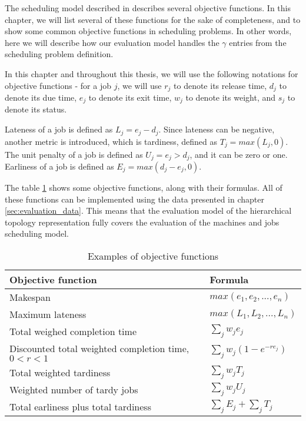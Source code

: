 The scheduling model described in \citep{pinedo2016scheduling} describes several objective functions. In this chapter, we will list several of these functions for the sake of completeness, and to show some common objective functions in scheduling problems. In other words, here we will describe how our evaluation model handles the $ \gamma $ entries from the scheduling problem definition.

In this chapter and throughout this thesis, we will use the following notations for objective functions - for a job $j$, we will use $r_j$ to denote its release time, $d_j$ to denote its due time, $e_j$ to denote its exit time, $w_j$ to denote its weight, and $s_j$ to denote its status.

Lateness of a job is defined as $L_j = e_j - d_j$. Since lateness can be negative, another metric is introduced, which is tardiness, defined as $T_j = max(L_j, 0)$. The unit penalty of a job is defined as $U_j = e_j > d_j$, and it can be zero or one. Earliness of a job is defined as $E_j = max(d_j - e_j, 0)$.

The table \ref{tab:objective_functions_table} shows some objective functions, along with their formulas. All of these functions can be implemented using the data presented in chapter \ref{sec:evaluation_data}. This means that the evaluation model of the hierarchical topology representation fully covers the evaluation of the machines and jobs scheduling model.

\begin{table}[!htbp]
    \begin{center}
        \begin{tabular}{|l|l|} 
         \hline
         Objective function & Formula \\ [0.5ex] 
         \hline\hline
         Makespan & $ max(e_1, e_2, ..., e_n) $ \\ 
         \hline
         Maximum lateness & $  max(L_1, L_2, ..., L_n) $ \\ 
         \hline
         Total weighed completion time & $ \sum_{j} w_j e_j $ \\ 
         \hline
         Discounted total weighted completion time, $ 0 < r < 1$ & $ \sum_{j} w_j (1 - e^{-r e_j}) $ \\ 
         \hline
         Total weighted tardiness & $ \sum_{j} w_j T_j $ \\ 
         \hline
         Weighted number of tardy jobs & $ \sum_{j} w_j U_j $ \\ 
         \hline
         Total earliness plus total tardiness & $ \sum_{j} E_j + \sum_{j} T_j $ \\ 
         \hline
        \end{tabular}
        \end{center}
        \caption{Examples of objective functions}
    \label{tab:objective_functions_table}
    \end{table}

